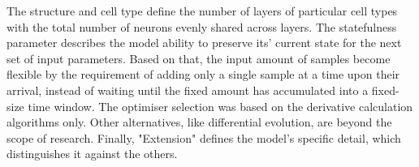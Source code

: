 
%
%
The structure and cell type define the number of layers of particular cell types with the total number of neurons evenly shared across layers.
The statefulness parameter describes the model ability to preserve its' current state for the next set of input parameters.
Based on that, the input amount of samples become flexible by the requirement of adding only a single sample at a time upon their arrival, instead of waiting until the fixed amount has accumulated into a fixed-size time window.
The optimiser selection was based on the derivative calculation algorithms only.
Other alternatives, like differential evolution, are beyond the scope of research.
Finally, "Extension" defines the model's specific detail, which distinguishes it against the others.

%
%
